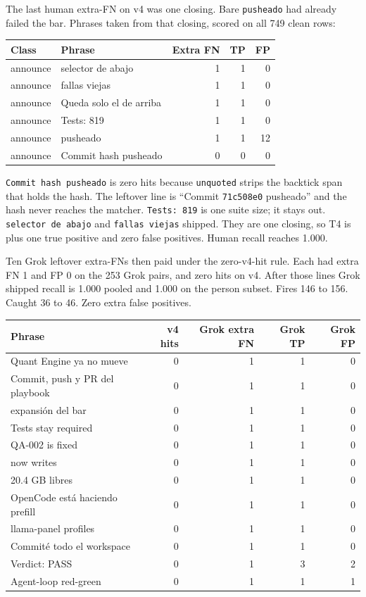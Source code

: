 The last human extra-FN on v4 was one closing. Bare
\texttt{pusheado} had already failed the bar. Phrases taken from
that closing, scored on all 749 clean rows:

\begin{center}
{\small\begin{tabular}{llrrr}
\toprule
Class & Phrase & Extra FN & TP & FP \\
\midrule
announce & selector de abajo & 1 & 1 & 0 \\
announce & fallas viejas & 1 & 1 & 0 \\
announce & Queda solo el de arriba & 1 & 1 & 0 \\
announce & Tests: 819 & 1 & 1 & 0 \\
announce & pusheado & 1 & 1 & 12 \\
announce & Commit hash pusheado & 0 & 0 & 0 \\
\bottomrule
\end{tabular}}
\end{center}

\texttt{Commit hash pusheado} is zero hits because \texttt{unquoted}
strips the backtick span that holds the hash. The leftover line is
``Commit \texttt{71c508e0} pusheado'' and the hash never reaches
the matcher. \texttt{Tests: 819} is one suite size; it stays out.
\texttt{selector de abajo} and \texttt{fallas viejas} shipped.
They are one closing, so T4 is plus one true positive and zero
false positives. Human recall reaches 1.000.

Ten Grok leftover extra-FNs then paid under the zero-v4-hit rule.
Each had extra FN 1 and FP 0 on the 253 Grok pairs, and zero hits
on v4. After those lines Grok shipped recall is 1.000 pooled and
1.000 on the person subset. Fires 146 to 156. Caught 36 to 46.
Zero extra false positives.

\begin{center}
{\small\begin{tabular}{lrrrr}
\toprule
Phrase & v4 hits & Grok extra FN & Grok TP & Grok FP \\
\midrule
Quant Engine ya no mueve & 0 & 1 & 1 & 0 \\
Commit, push y PR del playbook & 0 & 1 & 1 & 0 \\
expansi\'on del bar & 0 & 1 & 1 & 0 \\
Tests stay required & 0 & 1 & 1 & 0 \\
QA-002 is fixed & 0 & 1 & 1 & 0 \\
now writes & 0 & 1 & 1 & 0 \\
20.4 GB libres & 0 & 1 & 1 & 0 \\
OpenCode est\'a haciendo prefill & 0 & 1 & 1 & 0 \\
llama-panel profiles & 0 & 1 & 1 & 0 \\
Commit\'e todo el workspace & 0 & 1 & 1 & 0 \\
Verdict: PASS & 0 & 1 & 3 & 2 \\
Agent-loop red-green & 0 & 1 & 1 & 1 \\
\bottomrule
\end{tabular}}
\end{center}

